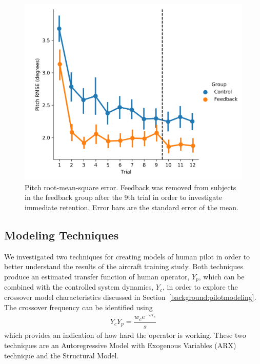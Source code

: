 \begin{figure}[tb]
    \centering
    \includegraphics[width=0.8\linewidth]{figures/Modeling/prms_arx.png}
    \caption[Pitch root-mean-square error]{Pitch root-mean-square error. Feedback was removed from subjects in the feedback group after the 9th trial in order to investigate immediate retention. Error bars are the standard error of the mean.}
    \label{fig:prmse}
\end{figure}

\subsection{Modeling Techniques}
We investigated two techniques for creating models of human pilot in order to better understand the results of the aircraft training study.
Both techniques produce an estimated transfer function of human operator, $Y_p$, which can be combined with the controlled system dynamics, $Y_c$, in order to explore the crossover model characteristics discussed in Section~\ref{background:pilotmodeling}.
The crossover frequency can be identified using
\begin{align}
    Y_c Y_p = \dfrac{w_c e^{-s \tau_e}}{s}
\end{align}
which provides an indication of how hard the operator is working.
These two techniques are an Autoregressive Model with Exogenous Variables (ARX) technique and the Structural Model.

